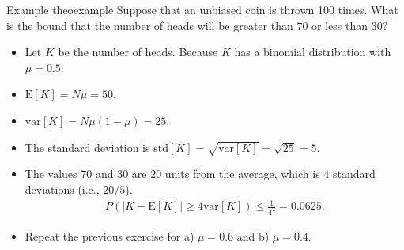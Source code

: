 \documentclass{tufte-handout}
\begin{document}
 \begin{mybox}{Example }{theoexample}
Suppose that an unbiased coin is thrown 100 times. What is the bound that the
number of heads will be greater than 70 or less than 30?
\begin{itemize}
\item Let $K$ be the number of heads. Because $K$  has a binomial distribution with $\mu=0.5$:
\item $\mathrm E[K]= N\mu=50$.
\item $ \mathrm{var}[K] = {N\mu(1-\mu)}=25$.
\item The standard deviation is  $ \mathrm{std}[K] = \sqrt{\mathrm{var}[K] }=\sqrt{25} = 5$.
\item The values $70$ and $30$ are $20$ units from the average, which is $4$ standard deviations (i.e., 
$20/5$).
\begin{align*}
P(\mid K-\mathrm E[K] \mid \geq 4 \mathrm{var}[K] ) \leq \frac{1}{4^2} = 0.0625.
\end{align*}
\item Repeat the previous exercise for a) $\mu=0.6$ and b) $\mu=0.4$.
\end{itemize}
\end{mybox}

\vspace{1cm}

\vspace{1cm}
\end{document}
